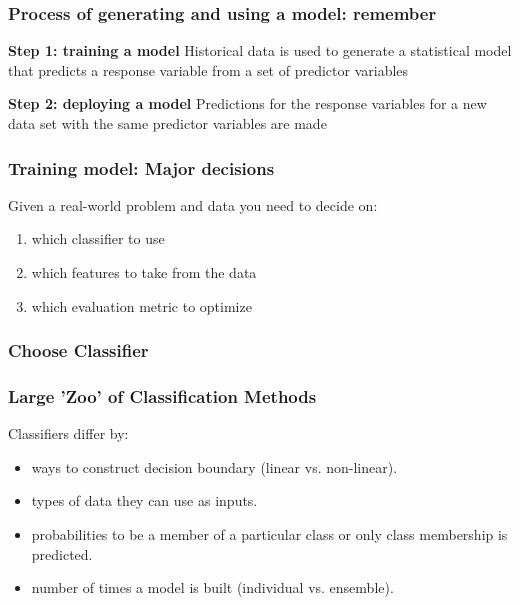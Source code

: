 \documentclass{beamer}
\begin{document}
\begin{frame}
	\frametitle{Process of generating and using a model: remember}
	
\textbf{	Step 1: training a model}
		\vspace{0.2cm}
	Historical data is used to generate a statistical model that predicts a 
	response variable from a set of predictor variables
	
	\vspace{0.5cm}
	
\textbf{	Step 2: deploying a model}
		\vspace{0.2cm}
	Predictions for the response variables for a new data set with the same 
	predictor variables are made		
\end{frame}




\begin{frame}
	\frametitle{Training model: Major decisions}
	
	Given a real-world problem and data you need to decide on:
	\begin{enumerate}
		\item which classifier to use
			\vspace{0.2cm}
		\item which features to take from the data
			\vspace{0.2cm}
		\item which evaluation metric to optimize 
	\end{enumerate}
\end{frame}


\subsubsection{Choose Classifier}

\begin{frame}
	\frametitle{Large 'Zoo' of Classification Methods}
	
	Classifiers differ by: 
	
	\begin{itemize}
		\item ways to construct decision boundary (linear vs. non-linear).
			\vspace{0.2cm}
		\item types of data they can use as inputs.
			\vspace{0.2cm}
		\item probabilities to be a member of a particular class or only class 
		membership is predicted.
			\vspace{0.2cm}
		\item number of times a model is built (individual vs. ensemble).
	\end{itemize}
\end{frame}
\end{document}
